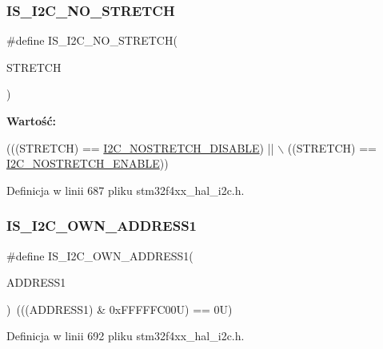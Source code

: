 \subsubsection{\texorpdfstring{I\+S\+\_\+\+I2\+C\+\_\+\+N\+O\+\_\+\+S\+T\+R\+E\+T\+CH}{IS\_I2C\_NO\_STRETCH}}
{\footnotesize\ttfamily \#define I\+S\+\_\+\+I2\+C\+\_\+\+N\+O\+\_\+\+S\+T\+R\+E\+T\+CH(\begin{DoxyParamCaption}\item[{}]{S\+T\+R\+E\+T\+CH }\end{DoxyParamCaption})}

{\bfseries Wartość\+:}
\begin{DoxyCode}
(((STRETCH) == \hyperlink{group___i2_c__nostretch__mode_ga611deefe89e56fa65f853e6796f2cf66}{I2C\_NOSTRETCH\_DISABLE}) || \(\backslash\)
                                    ((STRETCH) == \hyperlink{group___i2_c__nostretch__mode_ga67ebace1182d99bb5d7968994c01c80e}{I2C\_NOSTRETCH\_ENABLE}))
\end{DoxyCode}


Definicja w linii 687 pliku stm32f4xx\+\_\+hal\+\_\+i2c.\+h.

\mbox{\label{group___i2_c___i_s___r_t_c___definitions_gad84e8b9523d45b6105b4d5cb68994a79}} 
\subsubsection{\texorpdfstring{I\+S\+\_\+\+I2\+C\+\_\+\+O\+W\+N\+\_\+\+A\+D\+D\+R\+E\+S\+S1}{IS\_I2C\_OWN\_ADDRESS1}}
{\footnotesize\ttfamily \#define I\+S\+\_\+\+I2\+C\+\_\+\+O\+W\+N\+\_\+\+A\+D\+D\+R\+E\+S\+S1(\begin{DoxyParamCaption}\item[{}]{A\+D\+D\+R\+E\+S\+S1 }\end{DoxyParamCaption})~(((A\+D\+D\+R\+E\+S\+S1) \& 0x\+F\+F\+F\+F\+F\+C00\+U) == 0\+U)}



Definicja w linii 692 pliku stm32f4xx\+\_\+hal\+\_\+i2c.\+h.

